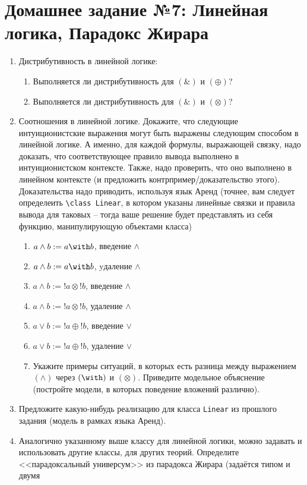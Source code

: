 \documentclass[10pt,a4paper,oneside]{article}
\begin{document}
\section*{Домашнее задание №7: Линейная логика, Парадокс Жирара}
\begin{enumerate}
\item Дистрибутивность в линейной логике:
\begin{enumerate}
\item Выполняется ли дистрибутивность для $(\&)$ и $(\oplus)$?
\item Выполняется ли дистрибутивность для $(\&)$ и $(\otimes)$?
\end{enumerate}
\item Соотношения в линейной логике. Докажите, что следующие интуиционистские выражения могут быть
выражены следующим способом в линейной логике. А именно, для каждой формулы, выражающей связку,
 надо доказать, что соответствующее правило вывода выполнено в интуиционистском контексте.
Также, надо проверить, что оно выполнено в линейном контексте (и предложить контрпример/доказательство этого).
Доказательства надо приводить, используя язык Аренд (точнее, вам следует определеить \verb!\class Linear!,
в котором указаны линейные связки и правила вывода для таковых -- тогда ваше решение будет представлять
из себя функцию, манипулирующую объектами класса)
\begin{enumerate}
\item $a \wedge b := a \with b$, введение $\wedge$
\item $a \wedge b := a \with b$, yдаление $\wedge$ 
\item $a \wedge b := !a \otimes !b$, введение $\wedge$
\item $a \wedge b := !a \otimes !b$, удаление $\wedge$
\item $a \vee b := !a \oplus !b$, введение $\vee$
\item $a \vee b := !a \oplus !b$, удаление $\vee$
\item Укажите примеры ситуаций, в которых есть разница между выражением $(\wedge)$ через $(\with)$ и $(\otimes)$.
Приведите модельное объяснение (постройте модели, в которых поведение вложений различно).
\end{enumerate}
\item Предложите какую-нибудь реализацию для класса \verb!Linear! из прошлого задания (модель в рамках языка Аренд).
\item Аналогично указанному выше классу для линейной логики, можно задавать и использовать другие классы,
для других теорий. Определите <<парадоксальный универсум>> из парадокса Жирара (задаётся типом и двумя

\end{enumerate}
\end{document}
